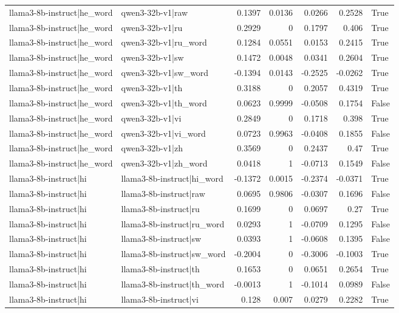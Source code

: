 \begin{table}
\begin{tabular}{l l r r r r l}
llama3-8b-instruct|he_word & qwen3-32b-v1|raw & 0.1397 & 0.0136 & 0.0266 & 0.2528 & True \\
llama3-8b-instruct|he_word & qwen3-32b-v1|ru & 0.2929 & 0 & 0.1797 & 0.406 & True \\
llama3-8b-instruct|he_word & qwen3-32b-v1|ru_word & 0.1284 & 0.0551 & 0.0153 & 0.2415 & True \\
llama3-8b-instruct|he_word & qwen3-32b-v1|sw & 0.1472 & 0.0048 & 0.0341 & 0.2604 & True \\
llama3-8b-instruct|he_word & qwen3-32b-v1|sw_word & -0.1394 & 0.0143 & -0.2525 & -0.0262 & True \\
llama3-8b-instruct|he_word & qwen3-32b-v1|th & 0.3188 & 0 & 0.2057 & 0.4319 & True \\
llama3-8b-instruct|he_word & qwen3-32b-v1|th_word & 0.0623 & 0.9999 & -0.0508 & 0.1754 & False \\
llama3-8b-instruct|he_word & qwen3-32b-v1|vi & 0.2849 & 0 & 0.1718 & 0.398 & True \\
llama3-8b-instruct|he_word & qwen3-32b-v1|vi_word & 0.0723 & 0.9963 & -0.0408 & 0.1855 & False \\
llama3-8b-instruct|he_word & qwen3-32b-v1|zh & 0.3569 & 0 & 0.2437 & 0.47 & True \\
llama3-8b-instruct|he_word & qwen3-32b-v1|zh_word & 0.0418 & 1 & -0.0713 & 0.1549 & False \\
llama3-8b-instruct|hi & llama3-8b-instruct|hi_word & -0.1372 & 0.0015 & -0.2374 & -0.0371 & True \\
llama3-8b-instruct|hi & llama3-8b-instruct|raw & 0.0695 & 0.9806 & -0.0307 & 0.1696 & False \\
llama3-8b-instruct|hi & llama3-8b-instruct|ru & 0.1699 & 0 & 0.0697 & 0.27 & True \\
llama3-8b-instruct|hi & llama3-8b-instruct|ru_word & 0.0293 & 1 & -0.0709 & 0.1295 & False \\
llama3-8b-instruct|hi & llama3-8b-instruct|sw & 0.0393 & 1 & -0.0608 & 0.1395 & False \\
llama3-8b-instruct|hi & llama3-8b-instruct|sw_word & -0.2004 & 0 & -0.3006 & -0.1003 & True \\
llama3-8b-instruct|hi & llama3-8b-instruct|th & 0.1653 & 0 & 0.0651 & 0.2654 & True \\
llama3-8b-instruct|hi & llama3-8b-instruct|th_word & -0.0013 & 1 & -0.1014 & 0.0989 & False \\
llama3-8b-instruct|hi & llama3-8b-instruct|vi & 0.128 & 0.007 & 0.0279 & 0.2282 & True \\

\end{tabular}
\end{table}
